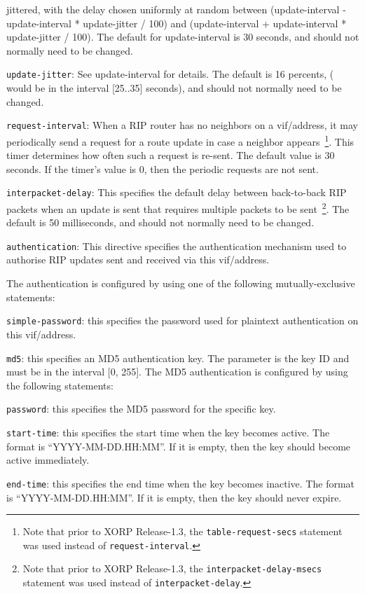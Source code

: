 \begin{description}
\begin{description}
  jittered, with the delay chosen uniformly at random between
  {\stt (update-interval - update-interval * update-jitter / 100)} and
  {\stt (update-interval + update-interval * update-jitter / 100)}.  The
  default for {\stt update-interval} is 30 seconds, and should
  not normally need to be changed.
\item{\tt update-jitter}: See {\stt update-interval}
  for details.  The default is 16 percents,
  ( would be in the interval [25..35] seconds),
  and should not normally need to be changed.
\item{\tt request-interval}: When a RIP router has no neighbors on a
  vif/address, it may periodically send a request for a route update
  in case a neighbor appears~\footnote{Note that prior to XORP
  Release-1.3, the {\tt table-request-secs} statement was used instead
  of {\tt request-interval}.}.  This timer determines how often such a
  request is re-sent. The default value is 30 seconds.
  If the timer's value is 0, then the periodic requests are not sent.
\item{\tt interpacket-delay}: This specifies the default delay
  between back-to-back RIP packets when an update is sent that
  requires multiple packets to be sent~\footnote{Note that prior to
  XORP Release-1.3, the {\tt interpacket-delay-msecs} statement was
  used instead of {\tt interpacket-delay}.}.  The default is 50
  milliseconds, and should not normally need to be changed.
\item{\tt authentication}: This directive specifies the authentication
mechanism used to authorise RIP updates sent and received via this
vif/address.  

The authentication is configured by using one of the following
mutually-exclusive statements:

\begin{description}
\item{\tt simple-password}: this specifies the password used for
  plaintext authentication on this vif/address.
\item{\tt md5}: this specifies an MD5 authentication key. The parameter
  is the key ID and must be in the interval [0, 255].
  The MD5 authentication is configured by using the following
  statements:
\begin{description}
  \item{\tt password}: this specifies the MD5 password for the specific
  key.
  \item{\tt start-time}: this specifies the start time when the key
  becomes active. The format is ``YYYY-MM-DD.HH:MM''. If it is empty,
  then the key should become active immediately.
  \item{\tt end-time}: this specifies the end time when the key becomes
  inactive. The format is ``YYYY-MM-DD.HH:MM''. If it is empty,
  then the key should never expire.
\end{description}


\end{description}
\end{description}
\end{description}
